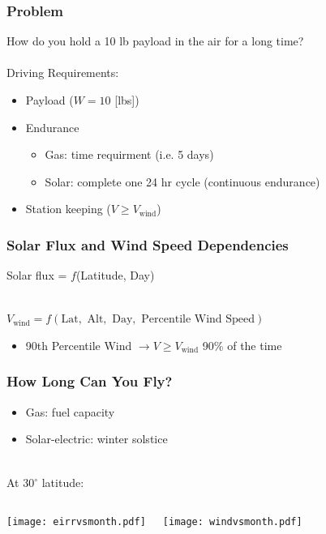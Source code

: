 \documentclass{beamer}
\begin{document}
\begin{frame}
    \frametitle{Problem}

    How do you hold a 10 lb payload in the air for a long time? \\~\\
    \pause
    Driving Requirements:
    \begin{itemize}
        \pause
        \item Payload ($W=10$ [lbs])
        \pause
        \item Endurance
            \begin{itemize}
                \pause
                \item Gas: time requirment (i.e. 5 days)
                \pause
                \item Solar: complete one 24 hr cycle (continuous endurance)
                \end{itemize}
        \pause
        \item Station keeping ($V \geq V_{\text{wind}}$)
    \end{itemize}

\end{frame}

\begin{frame}
    \frametitle{Solar Flux and Wind Speed Dependencies}

    \pause

    Solar flux = $f$(Latitude, Day) \\~\\

    \pause

    $ V_{\text{wind}} = f(\text{Lat}, \text{ Alt},  \text{ Day}, \text{ Percentile Wind Speed}) $

    \pause
    \begin{itemize}
        \item 90th Percentile Wind $\rightarrow V \geq V_{\text{wind}}$ 90\% of the time
        \end{itemize}


\end{frame}
 

\begin{frame}
    \frametitle{How Long Can You Fly?}

    \pause
    \begin{itemize}
        \item Gas: fuel capacity
            \pause
        \item Solar-electric: winter solstice \\~\\
    \end{itemize}

    \pause
    At 30$^{\circ}$ latitude:
    \begin{columns}
        \texttt{[image: eirrvsmonth.pdf]}
        
        \pause
        \texttt{[image: windvsmonth.pdf]}
    \end{columns}

\end{frame}
\end{document}
